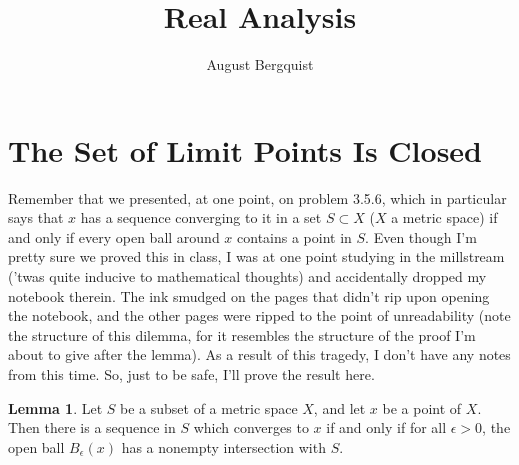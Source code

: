 \documentclass[11pt]{article}
\title{Real Analysis}
\author{August Bergquist}
\theoremstyle{definition}
\newtheorem{lemma}{Lemma}
\begin{document}
\maketitle


\section{The Set of Limit Points Is Closed}

Remember that we presented, at one point, on problem 3.5.6, which in particular says that $x$ has a sequence converging to it in a set $S\subset X$ ($X$ a metric space) if and only if every open ball around $x$ contains a point in $S$. Even though I'm pretty sure we proved this in class, I was at one point studying in the millstream ('twas quite inducive to mathematical thoughts) and accidentally dropped my notebook therein. The ink smudged on the pages that didn't rip upon opening the notebook, and the other pages were ripped to the point of unreadability (note the structure of this dilemma, for it resembles the structure of the proof I'm about to give after the lemma). As a result of this tragedy, I don't have any notes from this time. So, just to be safe, I'll prove the result here.

\begin{lemma}
Let $S$ be a subset of a metric space $X$, and let $x$ be a point of $X$. Then there is a sequence in $S$ which converges to $x$ if and only if for all $\epsilon > 0$, the open ball $B_\epsilon(x)$ has a nonempty intersection with $S$.
\end{lemma}
\end{document}
